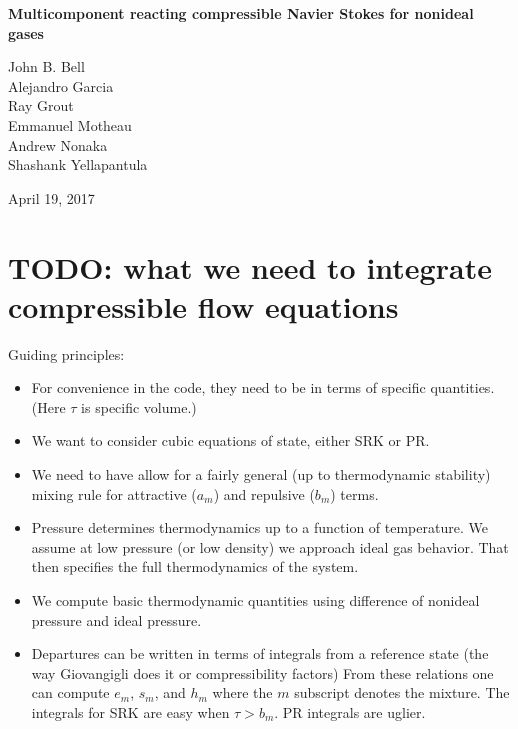 \documentclass[11pt]{article}
\begin{document}
\begin{center}
{\bf
Multicomponent reacting compressible Navier Stokes for nonideal gases
}

\vspace{\baselineskip}
John B. Bell \\
Alejandro Garcia \\
Ray Grout \\
Emmanuel Motheau \\
Andrew Nonaka \\
Shashank Yellapantula

\vspace{\baselineskip}
April 19, 2017
\end{center}

\section{TODO: what we need to integrate compressible flow equations}



Guiding principles:
\begin{itemize}
    \item For convenience in the code, they need to be in terms of specific quantities. (Here $\tau$ is specific volume.)
    \item We want to consider cubic equations of state, either SRK or PR. 
    \item We need to have allow for a
        fairly general (up to thermodynamic stability) mixing rule for attractive ($a_m$) and repulsive ($b_m$)
        terms. 
    \item Pressure determines thermodynamics up to a function of temperature.  
        We assume at low pressure (or low density) we approach ideal gas behavior.  That then specifies
        the full thermodynamics of the system.
    \item We compute basic thermodynamic quantities using difference of nonideal pressure and ideal pressure.
    \item Departures can be written in terms of integrals from a reference state (the way Giovangigli does it or compressibility factors)
        From these relations one can compute $e_m$, $s_m$, and $h_m$ where the $m$ subscript denotes the mixture.
        The integrals for SRK are easy when $\tau > b_m$.  PR integrals are uglier.  
\end{itemize}
\end{document}
